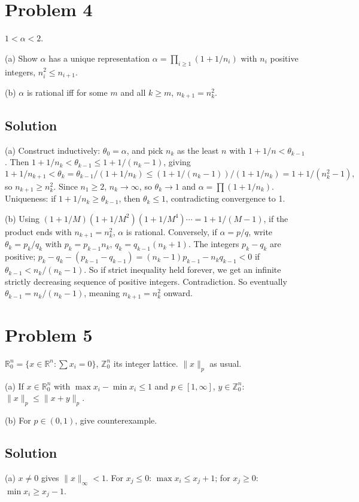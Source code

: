 \documentclass{article}
\begin{document}
\section*{Problem 4}
$1<\alpha<2$.

(a) Show $\alpha$ has a unique representation $\alpha=\prod_{i\ge 1}(1+1/n_i)$ with $n_i$ positive integers, $n_i^2\le n_{i+1}$.

(b) $\alpha$ is rational iff for some $m$ and all $k\ge m$, $n_{k+1}=n_k^2$.

\subsection*{Solution}
(a) Construct inductively: $\theta_0=\alpha$, and pick $n_k$ as the least $n$ with $1+1/n < \theta_{k-1}$. Then $1+1/n_k < \theta_{k-1} \le 1+1/(n_k-1)$, giving
\[1+1/n_{k+1} < \theta_k = \theta_{k-1}/(1+1/n_k) \le (1+1/(n_k-1))/(1+1/n_k) = 1+1/(n_k^2-1),\]
so $n_{k+1}\ge n_k^2$. Since $n_1\ge 2$, $n_k\to\infty$, so $\theta_k\to 1$ and $\alpha = \prod(1+1/n_k)$. Uniqueness: if $1+1/n_k\ge\theta_{k-1}$, then $\theta_k\le 1$, contradicting convergence to 1.

(b) Using $(1+1/M)(1+1/M^2)(1+1/M^4)\cdots = 1 + 1/(M-1)$, if the product ends with $n_{k+1}=n_k^2$, $\alpha$ is rational. Conversely, if $\alpha=p/q$, write $\theta_k=p_k/q_k$ with $p_k=p_{k-1}n_k$, $q_k=q_{k-1}(n_k+1)$. The integers $p_k-q_k$ are positive; $p_k-q_k - (p_{k-1}-q_{k-1}) = (n_k-1)p_{k-1}-n_k q_{k-1} < 0$ if $\theta_{k-1}<n_k/(n_k-1)$. So if strict inequality held forever, we get an infinite strictly decreasing sequence of positive integers. Contradiction. So eventually $\theta_{k-1}=n_k/(n_k-1)$, meaning $n_{k+1}=n_k^2$ onward.

\section*{Problem 5}
$\mathbb{R}_0^n = \{x\in\mathbb{R}^n : \sum x_i = 0\}$, $\mathbb{Z}_0^n$ its integer lattice. $\|x\|_p$ as usual.

(a) If $x\in\mathbb{R}_0^n$ with $\max x_i-\min x_i\le 1$ and $p\in[1,\infty]$, $y\in\mathbb{Z}_0^n$: $\|x\|_p\le\|x+y\|_p$.

(b) For $p\in(0,1)$, give counterexample.

\subsection*{Solution}
(a) $x\ne 0$ gives $\|x\|_\infty <1$. For $x_j\le 0$: $\max x_i\le x_j+1$; for $x_j\ge 0$: $\min x_i\ge x_j-1$.
\end{document}
